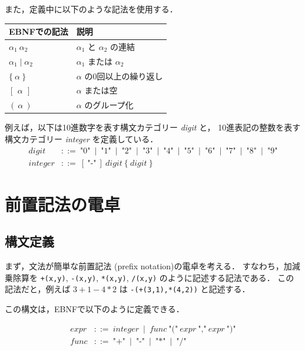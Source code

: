 \documentclass[a4j]{jsarticle}
\begin{document}
また，定義中に以下のような記法を使用する．


\begin{center}
\begin{tabular}{ll}
\hline
 EBNFでの記法              &  説明                             \\
\hline
 $\alpha_1\ \alpha_2$      &  $\alpha_1$ と $\alpha_2$ の連結  \\
 $\alpha_1 \mid \alpha_2$  &  $\alpha_1$ または $\alpha_2$     \\
 $\{\ \alpha\ \}$          &  $\alpha$ の0回以上の繰り返し     \\
 $[\ \,\alpha\ \,]$        &  $\alpha$ または空                \\
 $(\ \alpha\ )$            &  $\alpha$ のグループ化            \\
\hline
\end{tabular}
\end{center}



例えば，以下は10進数字を表す構文カテゴリー \emph{digit} と，
10進表記の整数を表す構文カテゴリー \emph{integer} を定義している．
\begin{align*}
  \textit{digit} & ::=\ 
  \mbox{"0"}\ \mid\ \mbox{"1"}\ \mid\ \mbox{"2"}\ \mid\ \mbox{"3"}\ \mid\ \mbox{"4"}\ \mid\ 
  \mbox{"5"}\ \mid\ \mbox{"6"}\ \mid\ \mbox{"7"}\ \mid\ \mbox{"8"}\ \mid\ \mbox{"9"} \\
  \textit{integer} & ::=\ 
  [\ \mbox{"-"}\ ]\ \textit{digit}\ \{\ \textit{digit}\ \}
\end{align*}
\section{前置記法の電卓}
\label{sec-4}
\subsection{構文定義}
\label{sec-4-1}

まず，文法が簡単な前置記法 (prefix notation)の電卓を考える．
すなわち，加減乗除算を
\texttt{+(x,y)}, \texttt{-(x,y)}, \texttt{*(x,y)}, \texttt{/(x,y)}
のように記述する記法である．
この記法だと，例えば $3+1-4*2$ は \texttt{-(+(3,1),*(4,2))} と記述する．

この構文は，EBNFで以下のように定義できる．

\begin{align*}
  \textit{expr} & ::=\ 
  \textit{integer}\ \mid\ 
  \textit{func}\ \mbox{"("}\ \textit{expr}\ \mbox{","}\ \textit{expr}\ \mbox{")"} \\
  \textit{func} & ::=\ 
  \mbox{"+"}\ \mid\ \mbox{"-"}\ \mid\ \mbox{"*"}\ \mid\ \mbox{"/"}
\end{align*}
\end{document}
